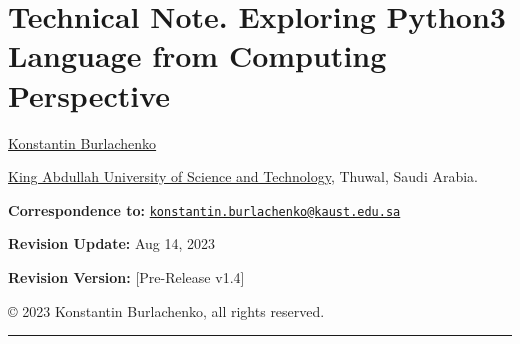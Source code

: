 \documentclass[
]{article}
\author{}
\date{}
\begin{document}
\hypertarget{technical-note-exploring-python3-language-from-computing-perspective}{%
\section{\texorpdfstring{Technical Note. Exploring Python3 Language from
Computing Perspective
}{Technical Note. Exploring Python3 Language from Computing Perspective }}\label{technical-note-exploring-python3-language-from-computing-perspective}}

\href{https://burlachenkok.github.io/}{Konstantin Burlachenko}

\href{https://www.kaust.edu.sa/en}{King Abdullah University of Science
and Technology}, Thuwal, Saudi Arabia.

\textbf{Correspondence to:}
\href{mailto:konstantin.burlachenko@kaust.edu.sa}{\nolinkurl{konstantin.burlachenko@kaust.edu.sa}}

\textbf{Revision Update:} Aug 14, 2023

\textbf{Revision Version:} {[}Pre-Release v1.4{]}

© 2023 Konstantin Burlachenko, all rights reserved.

\begin{center}\rule{0.5\linewidth}{0.5pt}\end{center}
\end{document}
